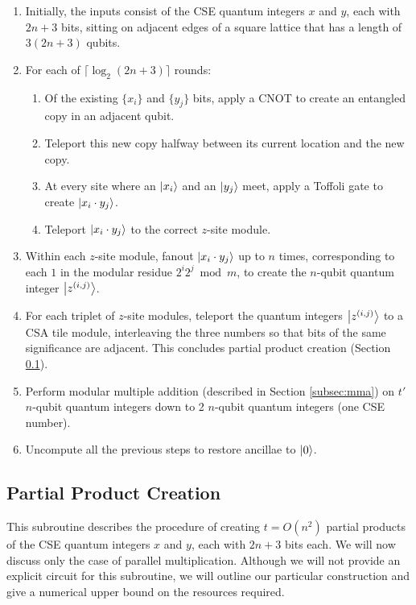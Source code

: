 \documentclass[twoside]{article}
\begin{document}
\begin{enumerate}
\item Initially, the inputs consist of the CSE quantum integers $x$ and $y$,
each with $2n+3$ bits, sitting on adjacent edges of a square lattice that has
a length of $3(2n+3)$ qubits.
\item For each of $\lceil \log_2 (2n+3) \rceil$ rounds:
\begin{enumerate}
\item Of the existing $\{x_i\}$ and $\{y_j\}$ bits, apply a CNOT to create an
entangled copy in an adjacent qubit.
\item Teleport this new copy halfway between its current location and the
new copy.
\item At every site where an $\left\vert{x_i}\right\rangle$ and an $\left\vert{y_j}\right\rangle$ meet,
apply a Toffoli gate to create $\left\vert{x_i \cdot y_j}\right\rangle$.
\item Teleport $\left\vert{x_i \cdot y_j}\right\rangle$ to the correct $z$-site module.
\end{enumerate}
\item Within each $z$-site module, fanout $\left\vert{x_i \cdot y_j}\right\rangle$ up to $n$
times, corresponding to each $1$ in the modular residue $2^i 2^j \bmod m$,
to create the $n$-qubit quantum integer $\left\vert{z^{(i,j)}}\right\rangle$.
\item For each triplet of $z$-site modules, teleport the quantum integers
$\left\vert{z^{(i,j)}}\right\rangle$ to a CSA tile module, interleaving the three numbers so that
bits of the same significance are adjacent. This concludes partial product
creation (Section \ref{subsec:ppc}).
\item Perform modular multiple addition (described in Section \ref{subsec:mma})
on $t'$ $n$-qubit quantum integers down to 2 $n$-qubit quantum integers (one CSE number).
\item Uncompute all the previous steps to restore ancillae to $\left\vert{0}\right\rangle$.
\end{enumerate}
\subsection{Partial Product Creation}
\label{subsec:ppc}

This subroutine describes the procedure of creating $t=O(n^2)$ partial products of
the CSE quantum integers $x$ and $y$, each with $2n+3$ bits each. We will now
discuss only the case of parallel multiplication. Although we
will not provide an explicit circuit for this subroutine, we will outline
our particular construction and give a numerical upper bound on the
resources required.
\end{document}
